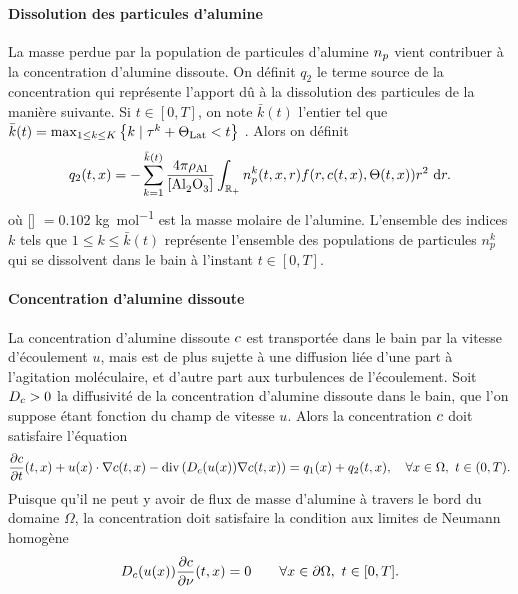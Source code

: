 \paragraph{Dissolution des particules d'alumine}
La masse perdue par la population de particules d'alumine
$n_p$ vient contribuer à la concentration d'alumine
dissoute. On définit $q_2$ le terme source de la concentration
qui représente l'apport dû à la dissolution des particules de la
manière suivante. Si $t \in [0, T]$, on note $\bar k(t)$ l'entier tel
que $\bar k(t) = \max_{1\leq k\leq K}\left\{ k \mid \tau^k + \Theta_\text{Lat} < t \right\}$ . Alors on définit
\begin{equation}
  q_2(t, x) = -\sum_{k = 1}^{\bar
    k(t)}\frac{4\pi\aluminadensity}{[\ce{Al2O3}]}\int_{\rplus}n_p^k(t,
  x, r)f(r, \concentration(t, x), \temperature(t, x))r^2\,\intd{r}.
\end{equation}
où [] $ = \num{0.102}$ \si{\kilo\gram\per\mol} est la masse
molaire de l'alumine. L'ensemble des indices $k$ tels que $1\leq k
\leq \bar k(t)$ représente l'ensemble des populations de particules
$n_p^k$ qui se dissolvent dans le bain à l'instant $t\in[0, T]$.

\paragraph{Concentration d'alumine dissoute}
La concentration d'alumine dissoute $c$ est transportée
dans le bain par la vitesse d'écoulement $u$, mais est de plus sujette
à une diffusion liée d'une part à l'agitation moléculaire, et d'autre
part aux turbulences de l'écoulement. Soit $D_c > 0$ la
diffusivité de la concentration d'alumine dissoute dans le bain, que
l'on suppose étant fonction du champ de vitesse $u$. Alors la
concentration $c$ doit satisfaire l'équation
\begin{equation}\label{eq:concentration}
  \frac{\partial c}{\partial t}(t, x) + u(x)\cdot\nabla c(t, x) - \mathrm{div}\left( D_c(u(x))
  \nabla c(t, x) \right) = q_1(x) + q_2(t, x),\quad \forall
  x\in\Omega,\ t\in (0, T).
\end{equation}
Puisque qu'il ne peut y avoir de flux de masse d'alumine à travers le
bord du domaine $\Omega$, la concentration doit satisfaire la
condition aux limites de Neumann homogène
\begin{equation}\label{eq:c-bc}
  D_{c}(u(x))\frac{\partial c}{\partial \nu}(t, x) = 0 \quad  \quad
  \forall x\in\partial \Omega,\ t\in[0, T].
\end{equation}


